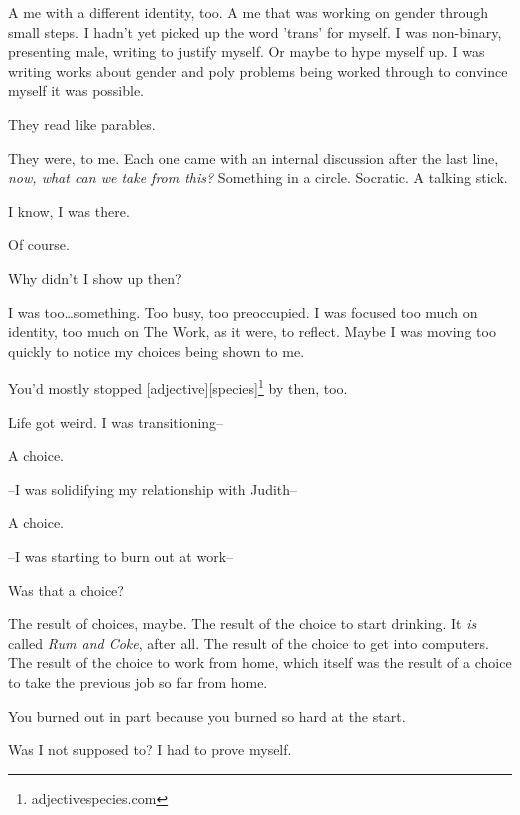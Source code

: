 \begin{paracol}{2}
\begin{leftcolumn}
A me with a different identity, too. A me that was working on gender through small steps. I hadn't yet picked up the word 'trans' for myself. I was non-binary, presenting male, writing to justify myself. Or maybe to hype myself up. I was writing works about gender and poly problems being worked through to convince myself it was possible.

\begin{ally}
They read like parables.
\end{ally}
They were, to me. Each one came with an internal discussion after the last line, \emph{now, what can we take from this?} Something in a circle. Socratic. A talking stick.

\begin{ally}
I know, I was there.
\end{ally}
Of course.

\begin{ally}
Why didn't I show up then?
\end{ally}
I was too\ldots{}something. Too busy, too preoccupied. I was focused too much on identity, too much on The Work, as it were, to reflect. Maybe I was moving too quickly to notice my choices being shown to me.

\begin{ally}
You'd mostly stopped [adjective][species]\footnote{adjectivespecies.com} by then, too.
\end{ally}
Life got weird. I was transitioning--

\begin{ally}
A choice.
\end{ally}
--I was solidifying my relationship with Judith--

\begin{ally}
A choice.
\end{ally}
--I was starting to burn out at work--

\begin{ally}
Was that a choice?
\end{ally}
The result of choices, maybe. The result of the choice to start drinking. It \emph{is} called \emph{Rum and Coke}, after all. The result of the choice to get into computers. The result of the choice to work from home, which itself was the result of a choice to take the previous job so far from home.

\begin{ally}
You burned out in part because you burned so hard at the start.
\end{ally}
Was I not supposed to? I had to prove myself.


\end{leftcolumn}
\end{paracol}
